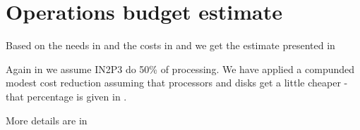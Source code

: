 \section{Operations budget estimate}\label{sec:opscost}
Based on the needs in  and the costs in  and 
we get the estimate presented in 



Again in  we assume IN2P3 do 50\% of processing.
We have applied a compunded modest cost reduction assuming that processors  and disks get a little cheaper - that
percentage is given in .

More details are in 


